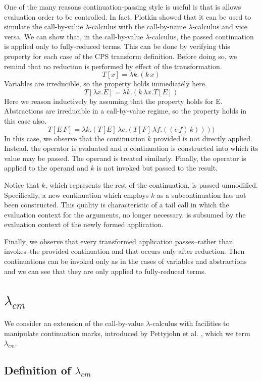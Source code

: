 \documentclass[ms,electronic,twosidetoc,letterpaper,chaptercenter,parttop]{byumsphd}
\begin{document}
One of the many reasons continuation-passing style is useful is that is allows evaluation
order to be controlled. In fact, Plotkin \cite{plotkin1975call} showed that it can be used
to simulate the call-by-value $\lambda$-calculus with the call-by-name $\lambda$-calculus
and vice versa. We can show that, in the call-by-value $\lambda$-calculus, the passed
continuation is applied only to fully-reduced terms. This can be done by verifying this
property for each case of the CPS transform definition. Before doing so, we remind that no
reduction is performed by effect of the transformation.
\[
T[x]=\lambda k.(k\,x)
\]
Variables are irreducible, so the property holds immediately here.
\[
T[\lambda x.E]=\lambda k.(k\,\lambda x.T[E])
\]
Here we reason inductively by assuming that the property holds for E. Abstractions are
irreducible in a call-by-value regime, so the property holds in this case also.
\[
T[E\,F]=\lambda k.(T[E]\,\lambda e.(T[F]\,\lambda f.((e\,f)\,k))))
\]
In this case, we observe that the continuation $k$ provided is not directly applied.
Instead, the operator is evaluated and a continuation is constructed into which its value
may be passed. The operand is treated similarly. Finally, the operator is applied to the
operand and $k$ is not invoked but passed to the result.

Notice that $k$, which represents the rest of the continuation, is passed unmodified.
Specifically, a new continuation which employs $k$ as a subcontinuation has not been
constructed. This quality is characteristic of a tail call in which the evaluation context
for the arguments, no longer necessary, is subsumed by the evaluation context of the newly
formed application.

Finally, we observe that every transformed application passes--rather than invokes--the
provided continuation and that occurs only after reduction. Then continuations can be
invoked only as in the cases of variables and abstractions and we can see that they are 
only applied to fully-reduced terms.

\chapter{$\lambda_{cm}$}

We consider an extension of the call-by-value $\lambda$-calculus with facilities to
manipulate continuation marks, introduced by Pettyjohn et al.
\cite{pettyjohn2005continuations}, which we term $\lambda_{cm}$.

\section{Definition of $\lambda_{cm}$}
\end{document}
